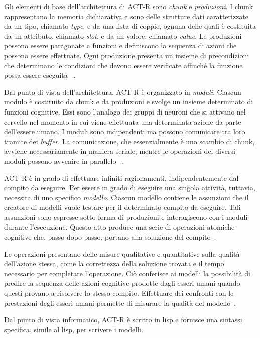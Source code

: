				Gli elementi di base dell'architettura di \mbox{ACT-R} sono \emph{chunk} e \emph{produzioni}.
				I chunk rappresentano la memoria dichiarativa e sono delle strutture dati caratterizzate da un tipo, chiamato \emph{type}, e da una lista di coppie, ognuna delle quali è costituita da un attributo, chiamato \emph{slot}, e da un valore, chiamato \emph{value}.
				Le produzioni possono essere paragonate a funzioni e definiscono la sequenza di azioni che possono essere effettuate.
				Ogni produzione presenta un insieme di precondizioni che determinano le condizioni che devono essere verificate affinché la funzione possa essere eseguita ~\cite{actr6refman}.

				Dal punto di vista dell'architettura, \mbox{ACT-R} è organizzato in \emph{moduli}.
				Ciascun modulo è costituito da chunk e da produzioni e svolge un insieme determinato di funzioni cognitive. 
				Essi sono l'analogo dei gruppi di neuroni che si attivano nel cervello nel momento in cui viene effettuata una determinata azione da parte dell'essere umano.
				I moduli sono indipendenti ma possono comunicare tra loro tramite dei \emph{buffer}. 
				La comunicazione, che essenzialmente è uno scambio di chunk, avviene necessariamente in maniera seriale, mentre le operazioni dei diversi moduli possono avvenire in parallelo ~\cite{actr6refman}.
				
				\mbox{ACT-R} è in grado di effettuare infiniti ragionamenti, indipendentemente dal compito da eseguire. 
				Per essere in grado di eseguire una singola attività, tuttavia, necessita di uno specifico \emph{modello}.
				Ciascun modello contiene le assunzioni che il creatore di modelli vuole testare per il determinato compito da eseguire.
				Tali assunzioni sono espresse sotto forma di produzioni e interagiscono con i moduli durante l'esecuzione.
				Questo atto produce una serie di operazioni atomiche cognitive che, passo dopo passo, portano alla soluzione del compito~\cite{Sears2012}. 
				
				Le operazioni presentano delle misure qualitative e quantitative sulla qualità dell'azione stessa, come la correttezza della soluzione trovata e il tempo necessario per completare l'operazione. 
				Ciò conferisce ai modelli la possibilità di predire la sequenza delle azioni cognitive prodotte dagli esseri umani quando questi provano a risolvere lo stesso compito. 
				Effettuare dei confronti con le prestazioni degli esseri umani permette di misurare la qualità del modello~\cite{Sears2012}.

				Dal punto di vista informatico, \mbox{ACT-R} è scritto in lisp e fornisce una sintassi specifica, simile al lisp, per scrivere i modelli.

